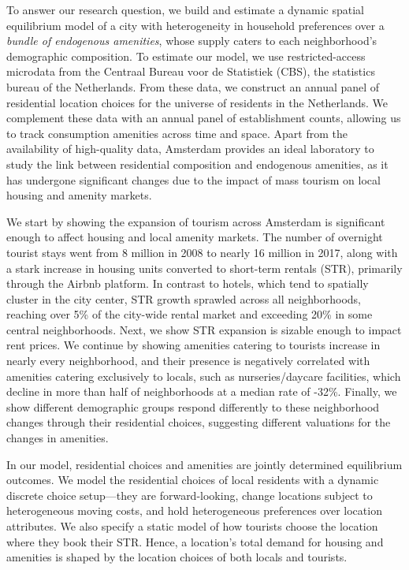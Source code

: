 \documentclass[11pt]{article}
\begin{document}
To answer our research question, we build and estimate a dynamic spatial equilibrium model of a city with heterogeneity in household preferences over a \textit{bundle of endogenous amenities}, whose supply caters to each neighborhood's demographic composition. To estimate our model, we use restricted-access microdata from the Centraal Bureau voor de Statistiek (CBS), the statistics bureau of the Netherlands. From these data, we construct an annual panel of residential location choices for the universe of residents in the Netherlands. We complement these data with an annual panel of establishment counts, allowing us to track consumption amenities across time and space. Apart from the availability of high-quality data, Amsterdam provides an ideal laboratory to study the link between residential composition and endogenous amenities, as it has undergone significant changes due to the impact of mass tourism on local housing and amenity markets.

We start by showing the expansion of tourism across Amsterdam is significant enough to affect housing and local amenity markets. The number of overnight tourist stays went from 8 million in 2008 to nearly 16 million in 2017, along with a stark increase in housing units converted to short-term rentals (STR), primarily through the Airbnb platform. In contrast to hotels, which tend to spatially cluster in the city center, STR growth sprawled across all neighborhoods, reaching over 5\% of the city-wide rental market and exceeding 20\% in some central neighborhoods. Next, we show STR expansion is sizable enough to impact rent prices. We continue by showing amenities catering to tourists increase in nearly every neighborhood, and their presence is negatively correlated with amenities catering exclusively to locals, such as nurseries/daycare facilities, which decline in more than half of neighborhoods at a median rate of -32\%. Finally, we show different demographic groups respond differently to these neighborhood changes through their residential choices, suggesting different valuations for the changes in amenities.


In our model, residential choices and amenities are jointly determined equilibrium outcomes.  We model the residential choices of local residents with a dynamic discrete choice setup---they are forward-looking, change locations subject to heterogeneous moving costs, and hold heterogeneous preferences over location attributes. We also specify a static model of how tourists choose the location where they book their STR. Hence, a location's total demand for housing and amenities is shaped by the location choices of both locals and tourists.
\end{document}
